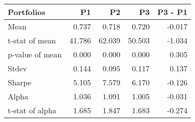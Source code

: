 \begin{tabular}{lrrrr}
\toprule
Portfolios & P1 & P2 & P3 & P3 - P1 \\
\midrule
Mean & 0.737 & 0.718 & 0.720 & -0.017 \\
t-stat of mean & 41.786 & 62.039 & 50.503 & -1.034 \\
p-value of mean & 0.000 & 0.000 & 0.000 & 0.305 \\
Stdev & 0.144 & 0.095 & 0.117 & 0.137 \\
Sharpe & 5.105 & 7.579 & 6.170 & -0.126 \\
Alpha & 1.036 & 1.091 & 1.005 & -0.031 \\
t-stat of alpha & 1.685 & 1.847 & 1.683 & -0.274 \\
\bottomrule
\end{tabular}
